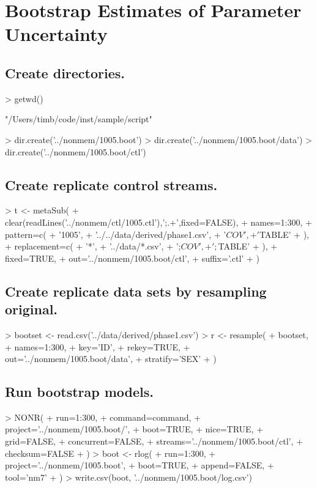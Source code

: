 \section{Bootstrap Estimates of Parameter Uncertainty}
\subsection{Create directories.}
\begin{Schunk}
\begin{Sinput}
> getwd()
\end{Sinput}
\begin{Soutput}
[1] "/Users/timb/code/inst/sample/script"
\end{Soutput}
\begin{Sinput}
> dir.create('../nonmem/1005.boot')
> dir.create('../nonmem/1005.boot/data')
> dir.create('../nonmem/1005.boot/ctl')
\end{Sinput}
\end{Schunk}
\subsection{Create replicate control streams.}
\begin{Schunk}
\begin{Sinput}
> t <- metaSub(
+      clear(readLines('../nonmem/ctl/1005.ctl'),';.+',fixed=FALSE),
+      names=1:300,
+      pattern=c(
+          '1005',
+          '../../data/derived/phase1.csv',
+          '$COV',
+          '$TABLE'
+      ),
+      replacement=c(
+          '*',
+          '../data/*.csv',
+          ';$COV',
+          ';$TABLE'
+     ),
+     fixed=TRUE,
+     out='../nonmem/1005.boot/ctl',
+     suffix='.ctl'
+  )
\end{Sinput}
\end{Schunk}
\subsection{Create replicate data sets by resampling original.}
\begin{Schunk}
\begin{Sinput}
>  bootset <- read.csv('../data/derived/phase1.csv')
>  r <- resample(
+  	bootset,
+  	names=1:300,
+  	key='ID',
+  	rekey=TRUE,
+  	out='../nonmem/1005.boot/data',
+  	stratify='SEX'
+  )
\end{Sinput}
\end{Schunk}
\subsection{Run bootstrap models.}
\begin{Schunk}
\begin{Sinput}
> NONR(
+      run=1:300,
+      command=command,
+      project='../nonmem/1005.boot/',
+      boot=TRUE,
+      nice=TRUE,
+      grid=FALSE,
+      concurrent=FALSE,
+      streams='../nonmem/1005.boot/ctl',
+      checksum=FALSE
+ )
> boot <- rlog(
+ 	run=1:300,
+ 	project='../nonmem/1005.boot',
+ 	boot=TRUE,
+ 	append=FALSE,
+ 	tool='nm7'
+ )
> write.csv(boot, '../nonmem/1005.boot/log.csv')  
\end{Sinput}
\end{Schunk}

